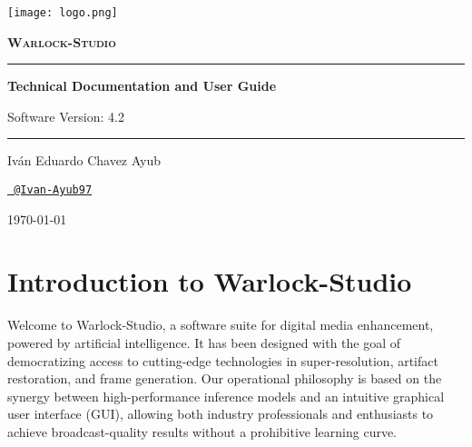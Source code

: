 \documentclass[11pt, a4paper]{article}
\newcommand{\SectionColor}{WarlockGray} %
\newcommand{\setsectioncolor}[1]{\renewcommand{\SectionColor}{#1}}
\begin{document}
\begin{titlepage}
    \begin{tcolorbox}[
        enhanced, sharp corners,
        colback=WarlockDark, colframe=WarlockGold,
        boxrule=2pt,
        height=\textheight,
        halign=center, valign=center
    ]
        \centering
        \texttt{[image: logo.png]}\par
        \vfill
        \color{WarlockWhite}
        {\Huge\bfseries\scshape Warlock-Studio\par}
        \vspace{1.5cm}
        \color{WarlockGold}
        \rule{0.6\textwidth}{1pt}\par
        \vspace{0.4cm}
        \color{WarlockWhite}
        {\Large\bfseries Technical Documentation and User Guide\par}
        \vspace{0.2cm}
        {\large Software Version: 4.2\par}
        \vspace{0.4cm}
        \color{WarlockGold}
        \rule{0.6\textwidth}{1pt}\par
        \vfill
        {\large Iván Eduardo Chavez Ayub\par}
        \href{https://github.com/Ivan-Ayub97}{\texttt{\color{WarlockGold}\faGithub\ @Ivan-Ayub97}}\par
        \vspace{1.5cm}
        {\large \today\par}
    \end{tcolorbox}
    \thispagestyle{empty}
\end{titlepage}

\newpage
\tableofcontents
\newpage

\setsectioncolor{IntroColor}
\section{Introduction to Warlock-Studio}
Welcome to Warlock-Studio, a software suite for digital media enhancement, powered by artificial intelligence. It has been designed with the goal of democratizing access to cutting-edge technologies in super-resolution, artifact restoration, and frame generation. Our operational philosophy is based on the synergy between high-performance inference models and an intuitive graphical user interface (GUI), allowing both industry professionals and enthusiasts to achieve broadcast-quality results without a prohibitive learning curve.
\end{document}
